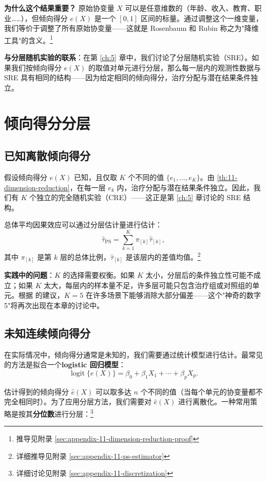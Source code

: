 \textbf{为什么这个结果重要？} 原始协变量 $X$ 可以是任意维数的（年龄、收入、教育、职业……），但倾向得分 $e(X)$ 是一个 $[0,1]$ 区间的标量。通过调整这个一维变量，我们等价于调整了所有原始协变量——这就是 Rosenbaum 和 Rubin 称之为"降维工具"的含义。\footnote{推导见附录 \cref{sec:appendix-11-dimension-reduction-proof}}

\textbf{与分层随机实验的联系}：在第 \ref{ch:5} 章中，我们讨论了分层随机实验（SRE）。如果我们按倾向得分 $e(X)$ 的取值对单元进行分层，那么每一层内的观测性数据与 SRE 具有相同的结构——因为给定相同的倾向得分，治疗分配与潜在结果条件独立。

\section{倾向得分分层}\label{sec:11-stratification}

\subsection{已知离散倾向得分}\label{sec:11-discrete-known}

假设倾向得分 $e(X)$ 已知，且仅取 $K$ 个不同的值 $\{e_1, \ldots, e_K\}$。由 \cref{th:11-dimension-reduction}，在每一层 $e_k$ 内，治疗分配与潜在结果条件独立。因此，我们有 $K$ 个独立的完全随机实验（CRE）——这正是第 \ref{ch:5} 章讨论的 SRE 结构。

总体平均因果效应可以通过分层估计量进行估计：
\[
\hat\tau_{\text{PS}} = \sum_{k=1}^K \pi_{[k]} \hat\tau_{[k]} ,
\label{eq:11-ps-estimator}
\]
其中 $\pi_{[k]}$ 是第 $k$ 层的总体比例，$\hat\tau_{[k]}$ 是该层内的差值均值。\footnote{详细推导见附录 \cref{sec:appendix-11-ps-estimator}}

\textbf{实践中的问题}：$K$ 的选择需要权衡。如果 $K$ 太小，分层后的条件独立性可能不成立；如果 $K$ 太大，每层内的样本量不足，许多层可能只包含治疗组或对照组的单元。根据 \citet{RosenbaumRubin:1983} 的建议，$K=5$ 在许多场景下能够消除大部分偏差——这个"神奇的数字 5"将再次出现在本章的讨论中。

\subsection{未知连续倾向得分}\label{sec:11-continuous-unknown}

在实际情况中，倾向得分通常是未知的，我们需要通过统计模型进行估计。最常见的方法是拟合一个\textbf{logistic 回归模型}：
\[
\operatorname{logit}\{e(X)\} = \beta_0 + \beta_1 X_1 + \cdots + \beta_p X_p .
\]

估计得到的倾向得分 $\hat{e}(X)$ 可以取多达 $n$ 个不同的值（当每个单元的协变量都不完全相同时）。为了应用分层方法，我们需要对 $\hat{e}(X)$ 进行离散化。一种常用策略是按其\textbf{分位数}进行分层：\footnote{详细讨论见附录 \cref{sec:appendix-11-discretization}}

